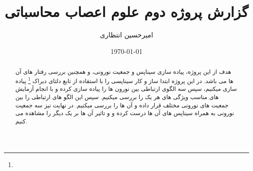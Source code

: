 \documentclass{report}
\title{گزارش پروژه دوم علوم اعصاب محاسباتی}
\author{امیرحسین انتظاری}
\date{\today}
\begin{document}
\maketitle
\newpage
\tableofcontents

    \begin{abstract}
        هدف از این پروژه، پیاده سازی سیناپس و جمعیت نورونی، و همچنین بررسی رفتار های آن ها می باشد. در این پروژه ابتدا ساز و کار سیناپسی را با استفاده از تابع دلتای دیراک 
        \footnote{}
        پیاده سازی میکنیم، سپس سه الگوی ارتباطی بین نورون ها را پیاده سازی کرده و با انجام آزمایش های مناسب ویژگی های هر یک را بررسی میکنیم. سپس این الگو های ارتباطی را بین جمعیت های نورونی مختلف قرار داده و آن ها را بررسی میکنیم. در نهایت نیز سه جمعیت نورونی به همراه سیناپس های آن ها درست کرده و و تاثیر آن ها بر یک دیگر را مشاهده می کنیم.
    \end{abstract}
\restoregeometry


\newpage

\newpage

\newpage


\end{document}
